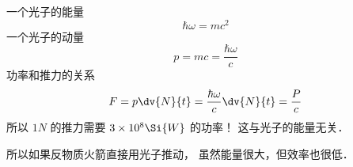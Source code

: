 
一个光子的能量
\begin{equation}
\hbar\omega = mc^2
\end{equation}
一个光子的动量
\begin{equation}
p = mc = \frac{\hbar\omega}{c}
\end{equation}
功率和推力的关系
\begin{equation}
F = p \dv{N}{t} = \frac{\hbar\omega}{c}\dv{N}{t} = \frac{P}{c}
\end{equation}
所以 $1N$ 的推力需要 $3\times 10^8\Si{W}$ 的功率！ 这与光子的能量无关．

所以如果反物质火箭直接用光子推动， 虽然能量很大，但效率也很低．
